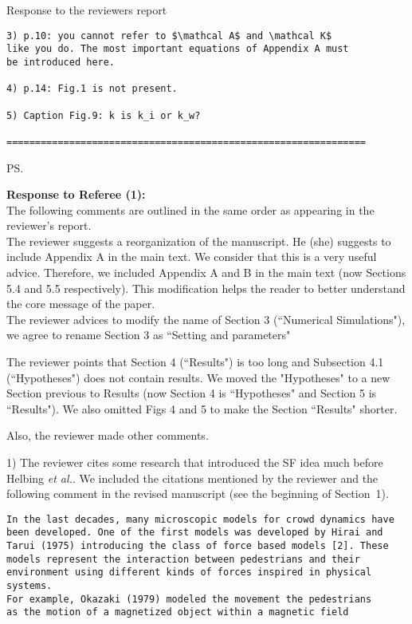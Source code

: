 \documentclass[a4paper,12pt]{letter}
\begin{document}
\begin{letter}{Response to the reviewers report}
\begin{verbatim}
3) p.10: you cannot refer to $\mathcal A$ and \mathcal K$ 
like you do. The most important equations of Appendix A must 
be introduced here.

4) p.14: Fig.1 is not present.

5) Caption Fig.9: k is k_i or k_w?

===============================================================
\end{verbatim}


\ps{\textbf{Response to Referee (1):}
\\ 

The following comments are outlined in the same order as appearing in the
reviewer’s report. \\

The reviewer suggests a reorganization of the manuscript. He (she) suggests to include Appendix A in the main text.
We consider that this is a very useful advice. Therefore, we included Appendix A and B in the main text (now Sections 5.4 and 5.5 respectively). 
This modification helps the reader to better understand the core message of the paper. \\ 

The reviewer advices to modify the name of Section 3 (``Numerical Simulations"), we agree to rename 
Section 3 as ``Setting and parameters"

The reviewer points that Section 4 (``Results") is too long and Subsection 4.1 (``Hypotheses")
does not contain results.  We moved the "Hypotheses" to a new Section previous to Results 
(now Section 4 is ``Hypotheses" and Section 5 is ``Results"). We also omitted Figs 4 and 5 to make
the Section ``Results" shorter. 

Also, the reviewer made other comments.

1) The reviewer cites some research that introduced the SF idea much before 
Helbing \textit{et al.}. We included the citations mentioned by the reviewer 
and the following comment in the revised manuscript (see the beginning of Section~1). 

\begin{verbatim}
In the last decades, many microscopic models for crowd dynamics have
been developed. One of the first models was developed by Hirai and 
Tarui (1975) introducing the class of force based models [2]. These
models represent the interaction between pedestrians and their 
environment using different kinds of forces inspired in physical systems.
For example, Okazaki (1979) modeled the movement the pedestrians 
as the motion of a magnetized object within a magnetic field
\end{verbatim}

}
\end{letter}
\end{document}
